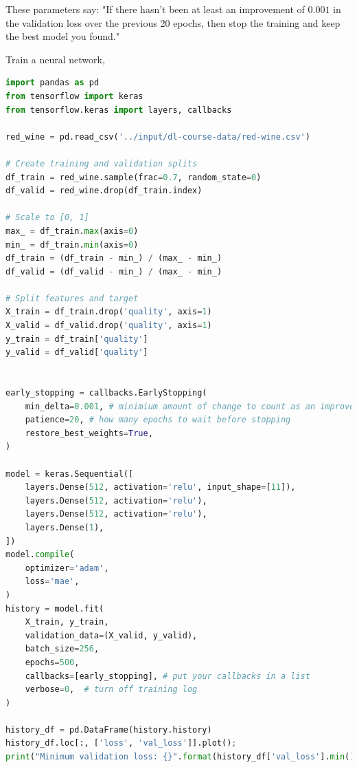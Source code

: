 \noindent These parameters say: "If there hasn't been at least an improvement of $ 0.001 $
in the validation loss over the previous 20 epochs, then stop the training and keep the best
model you found."

\vspace{0.5cm}
\noindent Train a neural network,

\begin{lstlisting}[language=Python]
import pandas as pd
from tensorflow import keras
from tensorflow.keras import layers, callbacks

red_wine = pd.read_csv('../input/dl-course-data/red-wine.csv')

# Create training and validation splits
df_train = red_wine.sample(frac=0.7, random_state=0)
df_valid = red_wine.drop(df_train.index)

# Scale to [0, 1]
max_ = df_train.max(axis=0)
min_ = df_train.min(axis=0)
df_train = (df_train - min_) / (max_ - min_)
df_valid = (df_valid - min_) / (max_ - min_)

# Split features and target
X_train = df_train.drop('quality', axis=1)
X_valid = df_valid.drop('quality', axis=1)
y_train = df_train['quality']
y_valid = df_valid['quality']


early_stopping = callbacks.EarlyStopping(
    min_delta=0.001, # minimium amount of change to count as an improvement
    patience=20, # how many epochs to wait before stopping
    restore_best_weights=True,
)

model = keras.Sequential([
    layers.Dense(512, activation='relu', input_shape=[11]),
    layers.Dense(512, activation='relu'),
    layers.Dense(512, activation='relu'),
    layers.Dense(1),
])
model.compile(
    optimizer='adam',
    loss='mae',
)
history = model.fit(
    X_train, y_train,
    validation_data=(X_valid, y_valid),
    batch_size=256,
    epochs=500,
    callbacks=[early_stopping], # put your callbacks in a list
    verbose=0,  # turn off training log
)

history_df = pd.DataFrame(history.history)
history_df.loc[:, ['loss', 'val_loss']].plot();
print("Minimum validation loss: {}".format(history_df['val_loss'].min()))
\end{lstlisting}

